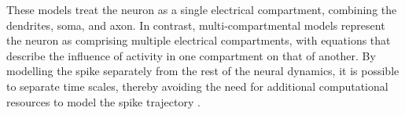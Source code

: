 \noindent These models treat the neuron as a single electrical compartment, combining the dendrites, soma, and axon. In contrast, multi-compartmental models represent the neuron as comprising multiple electrical compartments, with equations that describe the influence of activity in one compartment on that of another. By modelling the spike separately from the rest of the neural dynamics, it is possible to separate time scales, thereby avoiding the need for additional computational resources to model the spike trajectory \cite{abbott1999lapicque}. \\






